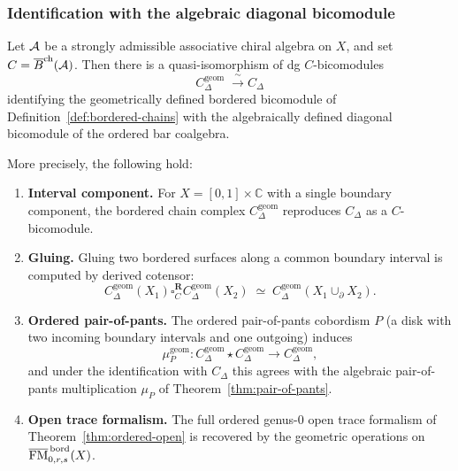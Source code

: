 \subsubsection{Identification with the algebraic diagonal bicomodule}

\begin{theorem}
\label{thm:bordered-realizes-diagonal}
Let $\mathcal{A}$ be a strongly admissible associative chiral algebra on $X$,
and set $C=\overline{B}^{\mathrm{ch}}(\mathcal{A})$. Then there is a quasi-isomorphism of dg
$C$-bicomodules
\[
C_\Delta^{\mathrm{geom}}
\;\xrightarrow{\;\sim\;}
C_\Delta
\]
identifying the geometrically defined bordered bicomodule of
Definition~\textup{\ref{def:bordered-chains}} with the
algebraically defined diagonal bicomodule of the ordered bar
coalgebra.

More precisely, the following hold:
\begin{enumerate}[label=\textup{(\arabic*)}]
\item \textbf{Interval component.}
 For $X=[0,1]\times\mathbb C$ with a single boundary component,
 the bordered chain complex $C_\Delta^{\mathrm{geom}}$ reproduces
 $C_\Delta$ as a $C$-bicomodule.

\item \textbf{Gluing.}
 Gluing two bordered surfaces along a common boundary interval
 is computed by derived cotensor:
 \[
 C_\Delta^{\mathrm{geom}}(X_1)
 \square_C^{\mathbf R}
 C_\Delta^{\mathrm{geom}}(X_2)
 \;\simeq\;
 C_\Delta^{\mathrm{geom}}(X_1\cup_{\partial}X_2).
 \]

\item \textbf{Ordered pair-of-pants.}
 The ordered pair-of-pants cobordism $P$ (a disk with two
 incoming boundary intervals and one outgoing) induces
 \[
 \mu_P^{\mathrm{geom}}\colon
 C_\Delta^{\mathrm{geom}}\star C_\Delta^{\mathrm{geom}}
 \longrightarrow
 C_\Delta^{\mathrm{geom}},
 \]
 and under the identification with $C_\Delta$ this agrees with
 the algebraic pair-of-pants multiplication $\mu_P$ of
 Theorem~\textup{\ref{thm:pair-of-pants}}.

\item \textbf{Open trace formalism.}
 The full ordered genus-$0$ open trace formalism of
 Theorem~\textup{\ref{thm:ordered-open}} is recovered by the
 geometric operations on
 $\overline{\mathrm{FM}}^{\,\mathrm{bord}}_{0,r,s}(X)$.
\end{enumerate}
\end{theorem}

